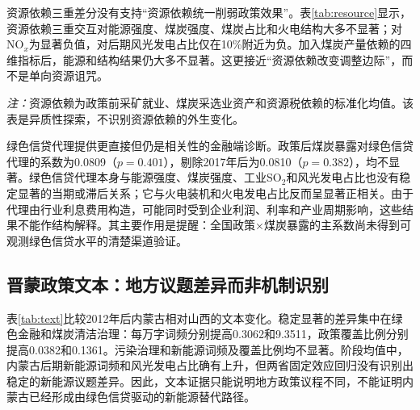 \documentclass[UTF8,12pt]{ctexart}
\newcommand{\note}[1]{\begin{minipage}{0.96\textwidth}\footnotesize\textit{注：}#1\end{minipage}}
\begin{document}
资源依赖三重差分没有支持“资源依赖统一削弱政策效果”。表\ref{tab:resource}显示，资源依赖三重交互对能源强度、煤炭强度、煤炭占比和火电结构大多不显著；对NO$_x$为显著负值，对后期风光发电占比仅在10\%附近为负。加入煤炭产量依赖的四维指标后，能源和结构结果仍大多不显著。这更接近“资源依赖改变调整边际”，而不是单向资源诅咒。

\begin{table}[H]
\centering
\caption{资源依赖的探索性三重交互}
\label{tab:resource}
\note{资源依赖为政策前采矿就业、煤炭采选业资产和资源税依赖的标准化均值。该表是异质性探索，不识别资源依赖的外生变化。}
\end{table}

绿色信贷代理提供更直接但仍是相关性的金融端诊断。政策后煤炭暴露对绿色信贷代理的系数为0.0809（$p=0.401$），剔除2017年后为0.0810（$p=0.382$），均不显著。绿色信贷代理本身与能源强度、煤炭强度、工业SO$_2$和风光发电占比也没有稳定显著的当期或滞后关系；它与火电装机和火电发电占比反而呈显著正相关。由于代理由行业利息费用构造，可能同时受到企业利润、利率和产业周期影响，这些结果不能作结构解释。其主要作用是提醒：全国政策×煤炭暴露的主系数尚未得到可观测绿色信贷水平的清楚渠道验证。

\subsection{晋蒙政策文本：地方议题差异而非机制识别}

表\ref{tab:text}比较2012年后内蒙古相对山西的文本变化。稳定显著的差异集中在绿色金融和煤炭清洁治理：每万字词频分别提高0.3062和9.3511，政策覆盖比例分别提高0.0382和0.1361。污染治理和新能源词频及覆盖比例均不显著。阶段均值中，内蒙古后期新能源词频和风光发电占比确有上升，但两省固定效应回归没有识别出稳定的新能源议题差异。因此，文本证据只能说明地方政策议程不同，不能证明内蒙古已经形成由绿色信贷驱动的新能源替代路径。
\end{document}
